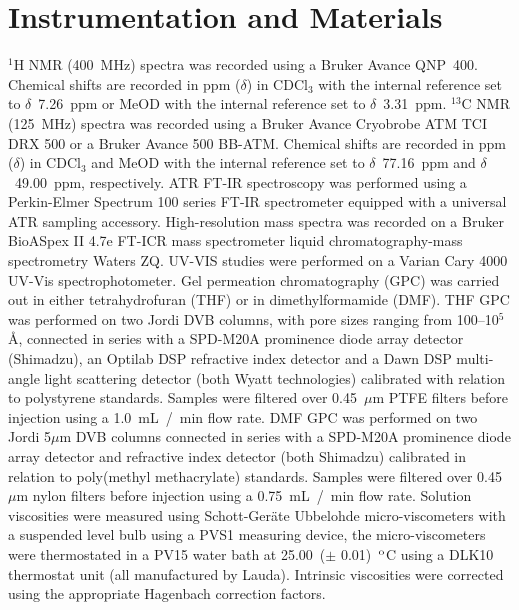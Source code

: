 \documentclass[a4wide,12pt]{report} %
\begin{document}
\section{Instrumentation and Materials}
\noindent  
$^{1}$H NMR (400~MHz) spectra was recorded using a Bruker Avance QNP~400. Chemical shifts are recorded in ppm ($\delta$) in CDCl$_{3}$ with the internal reference set to $\delta$~7.26~ppm or MeOD with the internal reference set to $\delta$~3.31~ppm.
%
 $^{13}$C NMR (125~MHz) spectra was recorded using a Bruker Avance Cryobrobe ATM TCI DRX 500 or a Bruker Avance 500 BB-ATM. Chemical shifts are recorded in ppm ($\delta$) in CDCl$_{3}$ and MeOD with the internal reference set to $\delta$~77.16~ppm and $\delta$~49.00~ppm, respectively.
%
ATR FT-IR spectroscopy was performed using a Perkin-Elmer Spectrum 100 series FT-IR spectrometer equipped with a universal ATR sampling accessory. 
%
High-resolution mass spectra was recorded on a Bruker BioASpex II 4.7e FT-ICR mass spectrometer liquid chromatography-mass spectrometry Waters ZQ. 
%
UV-VIS studies were performed on a Varian Cary 4000 UV-Vis spectrophotometer. 
%
Gel permeation chromatography (GPC) was carried out in either tetrahydrofuran (THF) or in dimethylformamide (DMF). 
%
THF GPC was performed on two Jordi DVB columns, with pore sizes ranging from 100--10$^{5}$\AA, connected in series with a SPD-M20A prominence diode array detector (Shimadzu), an Optilab DSP refractive index detector and a Dawn DSP multi-angle light scattering detector (both Wyatt technologies) calibrated with relation to polystyrene standards. 
%
Samples were filtered over 0.45~$\mu$m PTFE filters before injection using a 1.0~mL~/~min flow rate.
%
DMF GPC was performed on two Jordi 5$\mu$m DVB columns connected in series with a SPD-M20A prominence diode array detector  and refractive index detector (both Shimadzu) calibrated in relation to poly(methyl methacrylate) standards. 
%
Samples were filtered over 0.45~$\mu$m nylon filters before injection using a 0.75~mL~/~min flow rate. 
%
Solution viscosities were measured using Schott-Ger\"{a}te Ubbelohde micro-viscometers with a suspended level bulb using a PVS1 measuring device, the micro-viscometers were thermostated in a PV15 water bath at 25.00~($\pm$ 0.01)~$^{\textrm o}$C using a DLK10 thermostat unit (all manufactured by Lauda). 
%
Intrinsic viscosities were corrected using the appropriate Hagenbach correction factors. 
%
\end{document}
